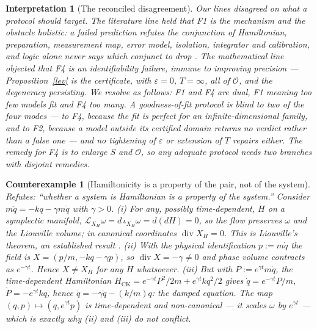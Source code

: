 \documentclass[12pt,a4paper]{article}
\theoremstyle{definition}
\theoremstyle{plain}
\theoremstyle{commentary}
\newtheorem{interpretation}[definition]{Interpretation}
\newtheorem{counterexample}[definition]{Counterexample}
\newcommand{\Oc}{\mathcal{O}}
\newcommand{\eps}{\varepsilon}
\newcommand{\dive}{\operatorname{div}}
\begin{document}
\begin{interpretation}[The reconciled disagreement]
\label{brn}
Our lines disagreed on what a protocol should target. The literature line held that F1 is the mechanism and the obstacle holistic: a failed prediction refutes the conjunction of Hamiltonian, preparation, measurement map, error model, isolation, integrator and calibration, and logic alone never says which conjunct to drop \cite{Duhem1954,Lakatos1970}. The mathematical line objected that F4 is an identifiability failure, \emph{immune} to improving precision --- Proposition~\ref{lev} is the certificate, with $\eps=0$, $T=\infty$, all of $\Oc$, and the degeneracy persisting. We resolve as follows: F1 and F4 are dual, F1 meaning \emph{too few} models fit and F4 \emph{too many}. A goodness-of-fit protocol is blind to two of the four modes --- to F4, because the fit is perfect for an infinite-dimensional family, and to F2, because a model outside its certified domain returns no verdict rather than a false one --- and no tightening of $\eps$ or extension of $T$ repairs either. The remedy for F4 is to \emph{enlarge $S$ and $\Oc$}, so any adequate protocol needs two branches with disjoint remedies.
\end{interpretation}

\begin{counterexample}[Hamiltonicity is a property of the pair, not of the system]
\label{damp}
Refutes: \emph{``whether a system is Hamiltonian is a property of the system.''}
Consider $m\ddot q=-kq-\gamma m\dot q$ with $\gamma>0$.
\emph{(i)} For any, possibly time-dependent, $H$ on a symplectic manifold, $\mathcal{L}_{X_H}\omega=d\,\iota_{X_H}\omega=d(dH)=0$, so the flow preserves $\omega$ and the Liouville volume; in canonical coordinates $\dive X_H=0$. This is Liouville's theorem, an established result \cite[Ch.~3]{AbrahamMarsden1978}.
\emph{(ii)} With the \emph{physical} identification $p:=m\dot q$ the field is $X=(p/m,-kq-\gamma p)$, so $\dive X=-\gamma\neq0$ and phase volume contracts as $e^{-\gamma t}$. Hence $X\neq X_H$ for any $H$ whatsoever.
\emph{(iii)} But with $P:=e^{\gamma t}m\dot q$, the time-dependent Hamiltonian $H_{\mathrm{CK}}=e^{-\gamma t}P^2/2m+e^{\gamma t}kq^2/2$ gives $\dot q=e^{-\gamma t}P/m$, $\dot P=-e^{\gamma t}kq$, hence $\ddot q=-\gamma\dot q-(k/m)q$: the damped equation. The map $(q,p)\mapsto(q,e^{\gamma t}p)$ is time-dependent and non-canonical --- it scales $\omega$ by $e^{\gamma t}$ --- which is exactly why (ii) and (iii) do not conflict.
\end{counterexample}
\end{document}

